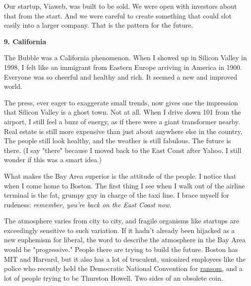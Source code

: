 Our
                  startup, Viaweb, was built to be sold. We were open with
                  investors about that from the start. And we were careful to
                  create something that could slot easily into a larger company.
                  That is the pattern for the future.

\textbf{9. California}

The Bubble was a California phenomenon. When I
                  showed up in Silicon Valley in 1998, I felt like an immigrant
                  from Eastern Europe arriving in America in 1900. Everyone was
                  so cheerful and healthy and rich. It seemed a new and improved
                  world.

The press, ever eager to exaggerate small
                  trends, now gives one the impression that Silicon Valley is a
                  ghost town. Not at all. When I drive down 101 from the
                  airport, I still feel a buzz of energy, as if there were a
                  giant transformer nearby. Real estate is still more expensive
                  than just about anywhere else in the country. The people still
                  look healthy, and the weather is still fabulous. The future is
                  there. (I say "there" because I moved back to the East Coast
                  after Yahoo. I still wonder if this was a smart idea.)

What
                  makes the Bay Area superior is the attitude of the people. I
                  notice that when I come home to Boston. The first thing I see
                  when I walk out of the airline terminal is the fat, grumpy guy
                  in charge of the taxi line. I brace myself for rudeness:
                  \emph{remember, you're back on the East Coast now.}

The atmosphere varies from city to city, and
                  fragile organisms like startups are exceedingly sensitive to
                  such variation. If it hadn't already been hijacked as a new
                  euphemism for liberal, the word to describe the atmosphere in
                  the Bay Area would be "progressive." People there are trying
                  to build the future. Boston has MIT and Harvard, but it also
                  has a lot of truculent, unionized employees like the police
                  who recently held the Democratic National Convention for
                  \href{http://www.usatoday.com/news/politicselections/nation/president/2004-04-30-boston-police-convention\_x.htm}{ransom}, and a lot of people trying to be Thurston Howell. Two sides
                  of an obsolete coin.

